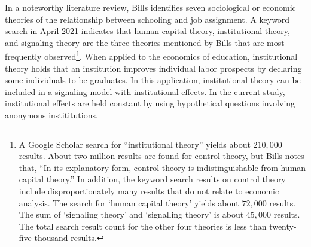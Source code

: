 \documentclass[review]{elsarticle}
\begin{document}
% 
In a noteworthy literature review, Bills identifies seven sociological or economic theories of the relationship between schooling and job assignment\cite{bills2003credentials}.
A keyword search in April 2021 indicates that human capital theory, institutional theory, and signaling theory are the three theories mentioned by Bills that are most frequently observed\footnote{
    A Google Scholar search for ``institutional theory'' yields about $210,000$ results.
    About two million results are found for control theory, but Bills notes that, ``In its explanatory form, control theory is indistinguishable from human capital theory.''
    In addition, the keyword search results on control theory include disproportionately many results that do not relate to economic analysis.
    The search for `human capital theory' yields about $72,000$ results.
    The sum of `signaling theory' and `signalling theory' is about $45,000$ results.
    The total search result count for the other four theories is less than twenty-five thousand results.
}.
When applied to the economics of education, institutional theory holds that an institution improves individual labor prospects by declaring some individuals to be graduates.
In this application, institutional theory can be included in a signaling model with institutional effects.
In the current study, institutional effects are held constant by using hypothetical questions involving anonymous instititutions.
\end{document}

